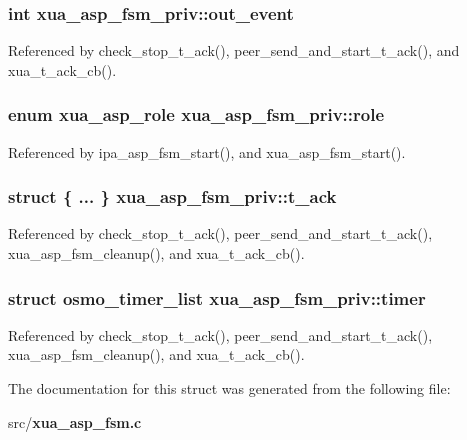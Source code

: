 \subsubsection[{out\+\_\+event}]{\setlength{\rightskip}{0pt plus 5cm}int xua\+\_\+asp\+\_\+fsm\+\_\+priv\+::out\+\_\+event}\label{structxua__asp__fsm__priv_a400fbc9c2375538b92f8fcd84caf9aa2}


Referenced by check\+\_\+stop\+\_\+t\+\_\+ack(), peer\+\_\+send\+\_\+and\+\_\+start\+\_\+t\+\_\+ack(), and xua\+\_\+t\+\_\+ack\+\_\+cb().

\subsubsection[{role}]{\setlength{\rightskip}{0pt plus 5cm}enum {\bf xua\+\_\+asp\+\_\+role} xua\+\_\+asp\+\_\+fsm\+\_\+priv\+::role}\label{structxua__asp__fsm__priv_af0c42a1f36f66d71416b16d1d948f2dd}


Referenced by ipa\+\_\+asp\+\_\+fsm\+\_\+start(), and xua\+\_\+asp\+\_\+fsm\+\_\+start().

\subsubsection[{t\+\_\+ack}]{\setlength{\rightskip}{0pt plus 5cm}struct \{ ... \}   xua\+\_\+asp\+\_\+fsm\+\_\+priv\+::t\+\_\+ack}\label{structxua__asp__fsm__priv_a8e4a67d348c50596b5e1528f4267d4b5}


Referenced by check\+\_\+stop\+\_\+t\+\_\+ack(), peer\+\_\+send\+\_\+and\+\_\+start\+\_\+t\+\_\+ack(), xua\+\_\+asp\+\_\+fsm\+\_\+cleanup(), and xua\+\_\+t\+\_\+ack\+\_\+cb().

\subsubsection[{timer}]{\setlength{\rightskip}{0pt plus 5cm}struct osmo\+\_\+timer\+\_\+list xua\+\_\+asp\+\_\+fsm\+\_\+priv\+::timer}\label{structxua__asp__fsm__priv_ac40da83243a67914fbd2a326d126a813}


Referenced by check\+\_\+stop\+\_\+t\+\_\+ack(), peer\+\_\+send\+\_\+and\+\_\+start\+\_\+t\+\_\+ack(), xua\+\_\+asp\+\_\+fsm\+\_\+cleanup(), and xua\+\_\+t\+\_\+ack\+\_\+cb().



The documentation for this struct was generated from the following file\+:\begin{DoxyCompactItemize}
\item 
src/{\bf xua\+\_\+asp\+\_\+fsm.\+c}\end{DoxyCompactItemize}
